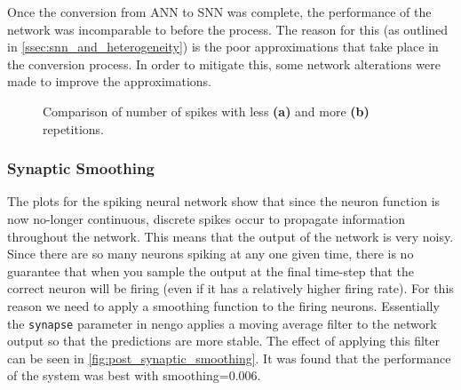 Once the conversion from ANN to SNN was complete, the performance of the network was incomparable to before the process. The reason for this (as outlined in \cref{ssec:snn_and_heterogeneity}) is the poor approximations that take place in the conversion process. In order to mitigate this, some network alterations were made to improve the approximations.

\begin{figure}[htb]%
    \centering
    \caption{Comparison of number of spikes with less \textbf{(a)} and more \textbf{(b)} repetitions.}%
    \label{fig:frame_repititions}%
\end{figure}

\subsubsection{Synaptic Smoothing}

The plots for the spiking neural network show that since the neuron function is now no-longer continuous, discrete spikes occur to propagate information throughout the network. This means that the output of the network is very noisy. Since there are so many neurons spiking at any one given time, there is no guarantee that when you sample the output at the final time-step that the correct neuron will be firing (even if it has a relatively higher firing rate). For this reason we need to apply a smoothing function to the firing neurons. Essentially the \lstinline{synapse} parameter in nengo applies a moving average filter to the network output so that the predictions are more stable. The effect of applying this filter can be seen in \cref{fig:post_synaptic_smoothing}. It was found that the performance of the system was best with smoothing=0.006.

